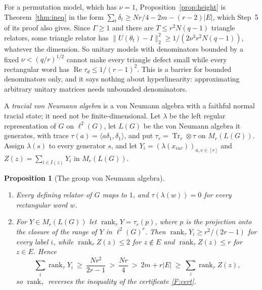 \documentclass[11pt]{article}
\newtheorem{proposition}[theorem]{Proposition}
\theoremstyle{definition}
\theoremstyle{remark}
\numberwithin{equation}{section}
\DeclareMathOperator{\rank}{rank}
\DeclareMathOperator{\Tr}{Tr}
\begin{document}
For a permutation model, which has $\nu=1$, Proposition~\ref{prop:height} is Theorem~\ref{thm:ineq} in the form $\sum_t\delta_t\ge Nr/4-2m-(r-2)|E|$, which Step~5 of its proof also gives. Since $\Gamma\ge1$ and there are $T\le r^2N(q-1)$ triangle relators, some triangle relator has $\|U(\theta_t)-I\|_2^2\ge1/(2\nu^3r^2N(q-1))$, whatever the dimension. So unitary models with denominators bounded by a fixed $\nu<(q/r)^{1/2}$ cannot make every triangle defect small while every rectangular word has $\operatorname{Re}\tau_d\le1/(r-1)^2$. This is a barrier for bounded denominators only, and it says nothing about hyperlinearity: approximating arbitrary unitary matrices needs unbounded denominators.

A \emph{tracial von Neumann algebra} is a von Neumann algebra with a faithful normal tracial state; it need not be finite-dimensional. Let $\lambda$ be the left regular representation of $G$ on $\ell^2(G)$, let $L(G)$ be the von Neumann algebra it generates, with trace $\tau(a)=\langle a\delta_1,\delta_1\rangle$, and put $\tau_r=\Tr_r\otimes\tau$ on $M_r(L(G))$. Assign $\lambda(s)$ to every generator $s$, and let $Y_i=(\lambda(x_{iuv}))_{u,v\in[r]}$ and $Z(z)=\sum_{i\in I(z)}Y_i$ in $M_r(L(G))$.

\begin{proposition}[The group von Neumann algebra]\label{prop:tracial}
\begin{enumerate}[label=(\alph*)]
\item Every defining relator of $G$ maps to $1$, and $\tau(\lambda(w))=0$ for every rectangular word $w$.
\item For $Y\in M_r(L(G))$ let $\rank_\tau Y=\tau_r(p)$, where $p$ is the projection onto the closure of the range of $Y$ in $\ell^2(G)^r$. Then $\rank_\tau Y_i\ge r^2/(2r-1)$ for every label $i$, while $\rank_\tau Z(z)\le2$ for $z\notin E$ and $\rank_\tau Z(z)\le r$ for $z\in E$. Hence
\[
 \sum_i\rank_\tau Y_i\ \ge\ \frac{Nr^2}{2r-1}\ >\ \frac{Nr}{4}\ >\ 2m+r|E|\ \ge\ \sum_z\rank_\tau Z(z),
\]
so $\rank_\tau$ reverses the inequality of the certificate \ref{F:cert}.
\end{enumerate}
\end{proposition}
\end{document}
